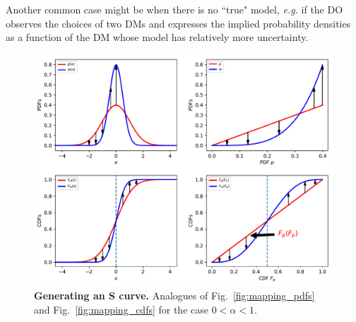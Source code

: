 \documentclass[a4paper, 12pt]{article}
\newcommand{\fref}[1]{Fig.~\ref{fig:#1}}
\newcommand{\eg}{\textit{e.g.}\xspace}
\newcommand{\vs}{\textit{vs.}\xspace}
\newcommand{\ND}{\mathcal{N}} %
\begin{document}
Another common case might be when there is no ``true" model, \eg if the DO observes the choices of two DMs and expresses the implied probability densities as a function of the DM whose model has relatively more uncertainty.

\begin{figure}[!htb]
\centering
\includegraphics[width=\textwidth]{./figs/mapping_pdfs_cdfs_Sshape.pdf}
\caption{
\textbf{Generating an S curve.} Analogues of \fref{mapping_pdfs} and \fref{mapping_cdfs} for the case $0<\alpha<1$.
}
\end{figure}
\end{document}
